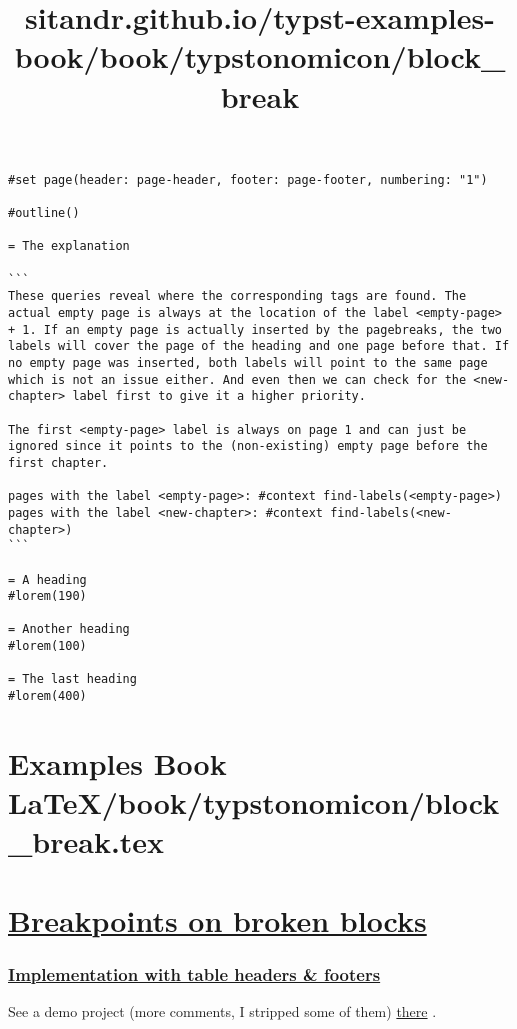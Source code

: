 \begin{verbatim}
#set page(header: page-header, footer: page-footer, numbering: "1")

#outline()

= The explanation

```
These queries reveal where the corresponding tags are found. The actual empty page is always at the location of the label <empty-page> + 1. If an empty page is actually inserted by the pagebreaks, the two labels will cover the page of the heading and one page before that. If no empty page was inserted, both labels will point to the same page which is not an issue either. And even then we can check for the <new-chapter> label first to give it a higher priority.

The first <empty-page> label is always on page 1 and can just be ignored since it points to the (non-existing) empty page before the first chapter.

pages with the label <empty-page>: #context find-labels(<empty-page>)
pages with the label <new-chapter>: #context find-labels(<new-chapter>)
```

= A heading
#lorem(190)

= Another heading
#lorem(100)

= The last heading
#lorem(400)
\end{verbatim}


\section{Examples Book LaTeX/book/typstonomicon/block_break.tex}
\title{sitandr.github.io/typst-examples-book/book/typstonomicon/block_break}

\section{\texorpdfstring{\hyperref[breakpoints-on-broken-blocks]{Breakpoints
on broken
blocks}}{Breakpoints on broken blocks}}\label{breakpoints-on-broken-blocks}

\subsubsection{\texorpdfstring{\hyperref[implementation-with-table-headers--footers]{Implementation
with table headers \&
footers}}{Implementation with table headers \& footers}}\label{implementation-with-table-headers--footers}

See a demo project (more comments, I stripped some of them)
\href{https://typst.app/project/r-yQHF952iFnPme9BWbRu3}{there} .

